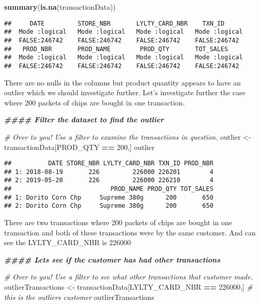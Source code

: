 \documentclass[
]{article}
\newenvironment{Shaded}{\begin{snugshade}}{\end{snugshade}}
\newcommand{\CommentTok}[1]{\textcolor[rgb]{0.56,0.35,0.01}{\textit{#1}}}
\newcommand{\DecValTok}[1]{\textcolor[rgb]{0.00,0.00,0.81}{#1}}
\newcommand{\DocumentationTok}[1]{\textcolor[rgb]{0.56,0.35,0.01}{\textbf{\textit{#1}}}}
\newcommand{\FunctionTok}[1]{\textcolor[rgb]{0.13,0.29,0.53}{\textbf{#1}}}
\newcommand{\NormalTok}[1]{#1}
\newcommand{\OtherTok}[1]{\textcolor[rgb]{0.56,0.35,0.01}{#1}}
\newcommand{\SpecialCharTok}[1]{\textcolor[rgb]{0.81,0.36,0.00}{\textbf{#1}}}
\begin{document}
\begin{Shaded}
\begin{Highlighting}[]
\FunctionTok{summary}\NormalTok{(}\FunctionTok{is.na}\NormalTok{(transactionData))}
\end{Highlighting}
\end{Shaded}

\begin{verbatim}
##     DATE         STORE_NBR       LYLTY_CARD_NBR    TXN_ID       
##  Mode :logical   Mode :logical   Mode :logical   Mode :logical  
##  FALSE:246742    FALSE:246742    FALSE:246742    FALSE:246742   
##   PROD_NBR       PROD_NAME        PROD_QTY       TOT_SALES      
##  Mode :logical   Mode :logical   Mode :logical   Mode :logical  
##  FALSE:246742    FALSE:246742    FALSE:246742    FALSE:246742
\end{verbatim}

There are no nulls in the columns but product quantity appears to have
an outlier which we should investigate further. Let's investigate
further the case where 200 packets of chips are bought in one
transaction.

\begin{Shaded}
\begin{Highlighting}[]
\DocumentationTok{\#\#\#\# Filter the dataset to find the outlier}

\CommentTok{\# Over to you! Use a filter to examine the transactions in question.}
\NormalTok{outlier }\OtherTok{\textless{}{-}}\NormalTok{ transactionData[PROD\_QTY }\SpecialCharTok{==} \DecValTok{200}\NormalTok{,]}
\NormalTok{outlier}
\end{Highlighting}
\end{Shaded}

\begin{verbatim}
##          DATE STORE_NBR LYLTY_CARD_NBR TXN_ID PROD_NBR
## 1: 2018-08-19       226         226000 226201        4
## 2: 2019-05-20       226         226000 226210        4
##                           PROD_NAME PROD_QTY TOT_SALES
## 1: Dorito Corn Chp     Supreme 380g      200       650
## 2: Dorito Corn Chp     Supreme 380g      200       650
\end{verbatim}

There are two transactions where 200 packets of chips are bought in one
transaction and both of these transactions were by the same customer.
And can see the LYLTY\_CARD\_NBR is 226000

\begin{Shaded}
\begin{Highlighting}[]
\DocumentationTok{\#\#\#\# Let\textquotesingle{}s see if the customer has had other transactions}

\CommentTok{\# Over to you! Use a filter to see what other transactions that customer made.}
\NormalTok{outlierTransactions }\OtherTok{\textless{}{-}}\NormalTok{ transactionData[LYLTY\_CARD\_NBR }\SpecialCharTok{==} \DecValTok{226000}\NormalTok{,] }\CommentTok{\# this is the outliers customer}
\NormalTok{outlierTransactions}
\end{Highlighting}
\end{Shaded}
\end{document}
